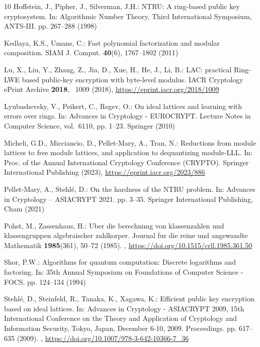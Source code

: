 \documentclass[runningheads, letter]{llncs}
\begin{document}
\begin{thebibliography}{10}
Hoffstein, J., Pipher, J., Silverman, J.H.: {NTRU:} {A} ring-based public key
  cryptosystem. In: Algorithmic Number Theory, Third International Symposium,
  ANTS-III. pp. 267--288 (1998)

Kedlaya, K.S., Umans, C.: Fast polynomial factorization and modular
  composition. SIAM J. Comput.  \textbf{40}(6),  1767--1802 (2011)

Lu, X., Liu, Y., Zhang, Z., Jia, D., Xue, H., He, J., Li, B.: {LAC:} practical
  {Ring}-{LWE} based public-key encryption with byte-level modulus. {IACR}
  Cryptology ePrint Archive  \textbf{2018}, ~1009 (2018),
  \url{https://eprint.iacr.org/2018/1009}

Lyubashevsky, V., Peikert, C., Regev, O.: On ideal lattices and learning with
  errors over rings. In: Advances in Cryptology - {EUROCRYPT}. Lecture Notes in
  Computer Science, vol.~6110, pp. 1--23. Springer (2010)

Micheli, G.D., Micciancio, D., Pellet-Mary, A., Tran, N.: Reductions from
  module lattices to free module lattices, and application to dequantizing
  module-{LLL}. In: Proc. of the Annual International Cryptology Conference
  (CRYPTO). Springer International Publishing (2023),
  \url{https://eprint.iacr.org/2023/886}

Pellet-Mary, A., Stehl{\'e}, D.: On the hardness of the {NTRU} problem. In:
  Advances in Cryptology -- ASIACRYPT 2021. pp. 3--35. Springer International
  Publishing, Cham (2021)

Pohst, M., Zassenhaus, H.: Uber die berechnung von klassenzahlen und
  klassengruppen algebraischer zahlkorper. Journal fur die reine und angewandte
  Mathematik  \textbf{1985}(361),  50--72 (1985).
  ,
  \url{https://doi.org/10.1515/crll.1985.361.50}

Shor, P.W.: Algorithms for quantum computation: Discrete logarithms and
  factoring. In: 35th Annual Symposium on Foundations of Computer Science -
  FOCS. pp. 124--134 (1994)

Stehl{\'{e}}, D., Steinfeld, R., Tanaka, K., Xagawa, K.: Efficient public key
  encryption based on ideal lattices. In: Advances in Cryptology - {ASIACRYPT}
  2009, 15th International Conference on the Theory and Application of
  Cryptology and Information Security, Tokyo, Japan, December 6-10, 2009.
  Proceedings. pp. 617--635 (2009). ,
  \url{https://doi.org/10.1007/978-3-642-10366-7\_36}

\end{thebibliography}
\end{document}
